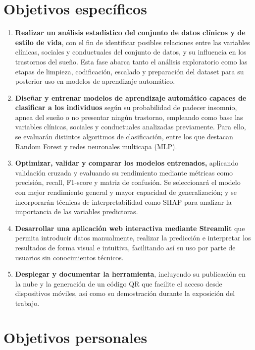 \section{Objetivos específicos}
\begin{enumerate}

\item  \textbf{Realizar un análisis estadístico del conjunto de datos clínicos y de estilo de vida}, con el fin de identificar posibles relaciones entre las variables clínicas, sociales y conductuales del conjunto de datos, y su influencia en los trastornos del sueño. Esta fase abarca tanto el análisis exploratorio como las etapas de limpieza, codificación, escalado y preparación del dataset para su posterior uso en modelos de aprendizaje automático.


\item \textbf{Diseñar y entrenar modelos de aprendizaje automático capaces de clasificar a los individuos} según su probabilidad de padecer insomnio, apnea del sueño o no presentar ningún trastorno, empleando como base las variables clínicas, sociales y conductuales analizadas previamente. Para ello, se evaluarán distintos algoritmos de clasificación, entre los que destacan Random Forest y redes neuronales multicapa (MLP).

\item \textbf{Optimizar, validar y comparar los modelos entrenados,} aplicando validación cruzada y evaluando su rendimiento mediante métricas como precisión, recall, F1-score y matriz de confusión. Se seleccionará el modelo con mejor rendimiento general y mayor capacidad de generalización; y se incorporarán técnicas de interpretabilidad como SHAP para analizar la importancia de las variables predictoras.

\item\textbf{Desarrollar una aplicación web interactiva mediante Streamlit} que permita introducir datos manualmente, realizar la predicción e interpretar los resultados de forma visual e intuitiva, facilitando así su uso por parte de usuarios sin conocimientos técnicos.

\item\textbf{Desplegar y documentar la herramienta}, incluyendo su publicación en la nube y la generación de un código QR que facilite el acceso desde dispositivos móviles, así como su demostración durante la exposición del trabajo.
\end{enumerate}


\section{Objetivos personales}

